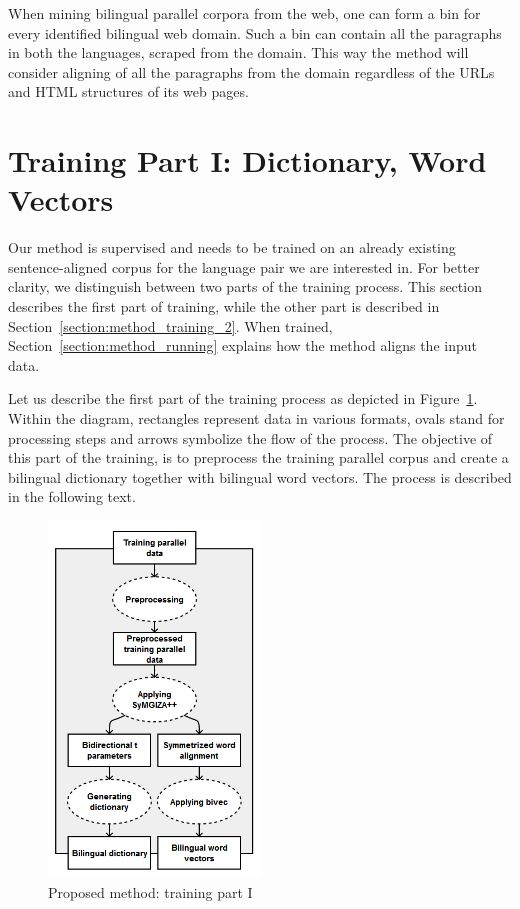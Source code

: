 When mining bilingual parallel corpora from the web, one can form a bin for every identified bilingual web domain. Such a bin can contain all the paragraphs in both the languages, scraped from the domain. This way the method will consider aligning of all the paragraphs from the domain regardless of the URLs and HTML structures of its web pages.

\section{Training Part I: Dictionary, Word Vectors}
\label{section:method_training_1}

Our method is supervised and needs to be trained on an already existing sentence-aligned corpus for the language pair we are interested in. For better clarity, we distinguish between two parts of the training process. This section describes the first part of training, while the other part is described in Section~\ref{section:method_training_2}. When trained, Section~\ref{section:method_running} explains how the method aligns the input data.

Let us describe the first part of the training process as depicted in Figure~\ref{figure:method_1}. Within the diagram, rectangles represent data in various formats, ovals stand for processing steps and arrows symbolize the flow of the process. The objective of this part of the training, is to preprocess the training parallel corpus and create a bilingual dictionary together with bilingual word vectors. The process is described in the following text.

\begin{figure}[!htb]
	\centering
	\caption{Proposed method: training part I}
	\label{figure:method_1}
	\vspace{1em}
	\includegraphics[width=0.50\textwidth]{images/method_1.png}
\end{figure}

